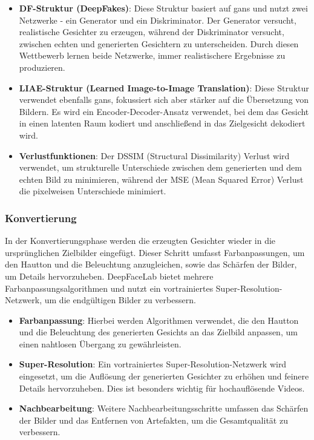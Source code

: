 \begin{itemize}
    \item \textbf{DF-Struktur (DeepFakes)}: Diese Struktur basiert auf \glspl{gan} und nutzt zwei Netzwerke - ein Generator und ein Diskriminator. 
    Der Generator versucht, realistische Gesichter zu erzeugen, während der Diskriminator versucht, zwischen echten und generierten Gesichtern zu unterscheiden.
    Durch diesen Wettbewerb lernen beide Netzwerke, immer realistischere Ergebnisse zu produzieren.
    \item \textbf{LIAE-Struktur (Learned Image-to-Image Translation)}: Diese Struktur verwendet ebenfalls \glspl{gan}, fokussiert sich aber stärker auf die Übersetzung von Bildern. 
     Es wird ein Encoder-Decoder-Ansatz verwendet, bei dem das Gesicht in einen latenten Raum kodiert und anschließend in das Zielgesicht dekodiert wird.
    \item \textbf{Verlustfunktionen}: Der DSSIM (Structural Dissimilarity) Verlust wird verwendet, um strukturelle Unterschiede zwischen dem generierten und dem echten Bild zu minimieren, während der MSE (Mean Squared Error) Verlust die pixelweisen Unterschiede minimiert.
\end{itemize}

\subsubsection{Konvertierung}
In der Konvertierungsphase werden die erzeugten Gesichter wieder in die ursprünglichen Zielbilder eingefügt.
Dieser Schritt umfasst Farbanpassungen, um den Hautton und die Beleuchtung anzugleichen, sowie das Schärfen der Bilder, um Details hervorzuheben.
DeepFaceLab bietet mehrere Farbanpassungsalgorithmen und nutzt ein vortrainiertes Super-Resolution-Netzwerk, um die endgültigen Bilder zu verbessern\cite{deepfacelabintegratedflexibleextensible, deepfacelab}.

\begin{itemize}
    \item \textbf{Farbanpassung}: Hierbei werden Algorithmen verwendet, die den Hautton und die Beleuchtung des generierten Gesichts an das Zielbild anpassen, um einen nahtlosen Übergang zu gewährleisten.
    \item \textbf{Super-Resolution}: Ein vortrainiertes Super-Resolution-Netzwerk wird eingesetzt, um die Auflösung der generierten Gesichter zu erhöhen und feinere Details hervorzuheben. 
     Dies ist besonders wichtig für hochauflösende Videos.
    \item \textbf{Nachbearbeitung}: Weitere Nachbearbeitungsschritte umfassen das Schärfen der Bilder und das Entfernen von Artefakten, um die Gesamtqualität zu verbessern.
\end{itemize}
